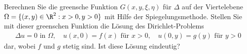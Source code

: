 
\begin{exercise}

Berechnen Sie die greensche Funktion $G(x,y,\xi,\eta)$ für $\Delta$ auf der Viertelebene
$\Omega = \{(x,y) \in \R^2: x > 0, y > 0\}$ mit Hilfe der Spiegelungsmethode.
Stellen Sie mit dieser greenschen Funktion die Lösung des Dirichlet-Problems
\begin{align*}
  \Delta u = 0 \text{ in } \Omega, \quad u(x,0) = f(x) \text{ für } x > 0,
  \quad u(0,y) = g(y) \text{ für } y > 0
\end{align*}
dar, wobei $f$ und $g$ stetig sind. Ist diese Lösung eindeutig?
\end{exercise}


\begin{solution}
\phantom{}

\end{solution}


